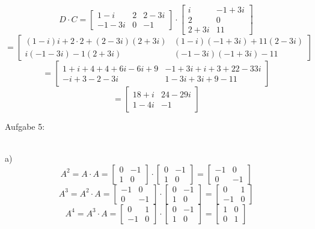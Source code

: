 \documentclass[11pt]{article}
\begin{document}
					$$D\cdot C=\begin{bmatrix}1-i&2&2-3i\\-1-3i&0&-1\end{bmatrix}\cdot\begin{bmatrix}i&-1+3i\\2&0\\2+3i&11\end{bmatrix}$$
					$$=\begin{bmatrix}(1-i)i+2\cdot 2+(2-3i)(2+3i)&(1-i)(-1+3i)+11(2-3i)\\i(-1-3i)-1(2+3i)&(-1-3i)(-1+3i)-11\end{bmatrix}$$
					$$=\begin{bmatrix}1+i+4+4+6i-6i+9&-1+3i+i+3+22-33i\\-i+3-2-3i&1-3i+3i+9-11\end{bmatrix}$$
					$$=\begin{bmatrix}18+i&24-29i\\1-4i&-1\end{bmatrix}$$
			\noindent \begin{Large}Aufgabe 5:\end{Large}\\[2pt]
				\indent a)\\
					$$A^2=A\cdot A=\begin{bmatrix}0&-1\\1&0\end{bmatrix}\cdot\begin{bmatrix}0&-1\\1&0\end{bmatrix}=\begin{bmatrix}-1&0\\0&-1\end{bmatrix}$$
					$$A^3=A^2\cdot A=\begin{bmatrix}-1&0\\0&-1\end{bmatrix}\cdot\begin{bmatrix}0&-1\\1&0\end{bmatrix}=\begin{bmatrix}0&1\\-1&0\end{bmatrix}$$
					$$A^4=A^3\cdot A=\begin{bmatrix}0&1\\-1&0\end{bmatrix}\cdot\begin{bmatrix}0&-1\\1&0\end{bmatrix}=\begin{bmatrix}1&0\\0&1\end{bmatrix}$$
\end{document}
